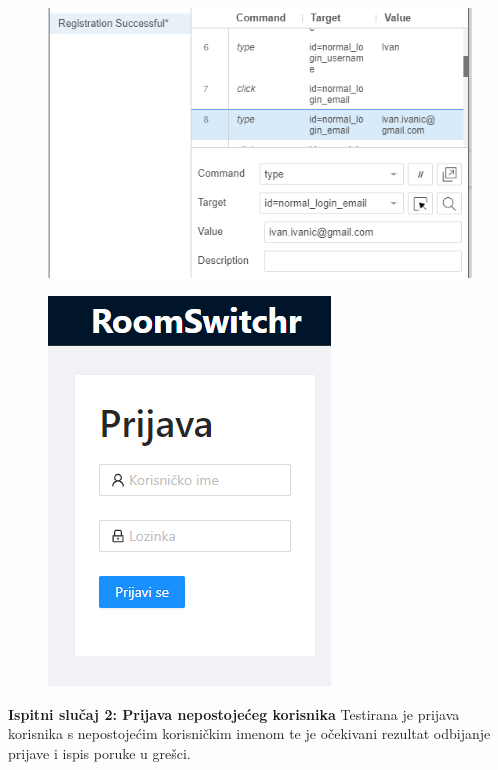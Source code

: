 			\begin{figure}[H]
				\includegraphics[scale=0.6]{slike/test8.PNG} %
				\centering
				\label{fig:test8}
			\end{figure}
			\begin{figure}[H]
				\includegraphics[scale=0.6]{slike/test8pom.PNG} %
				\centering
				\label{fig:test8pom}
			\end{figure}
			
			\textbf{Ispitni slučaj 2: Prijava nepostojećeg korisnika}	
			Testirana je prijava korisnika s nepostojećim korisničkim imenom te je očekivani rezultat odbijanje prijave i ispis poruke u grešci.
			
